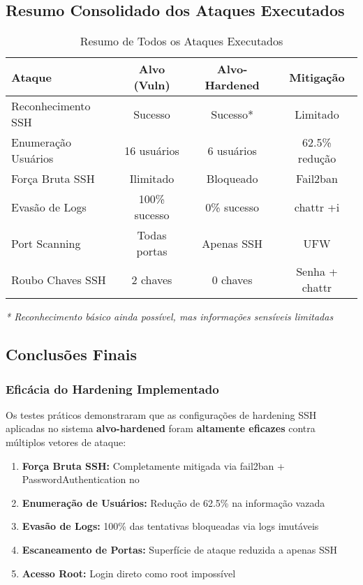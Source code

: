 \documentclass[12pt]{article}
\begin{document}
\subsection{Resumo Consolidado dos Ataques Executados}

\begin{table}[h]
\centering
\begin{tabular}{|l|c|c|c|}
\hline
\textbf{Ataque} & \textbf{Alvo (Vuln)} & \textbf{Alvo-Hardened} & \textbf{Mitigação} \\ \hline
Reconhecimento SSH & Sucesso & Sucesso* & Limitado \\ \hline
Enumeração Usuários & 16 usuários & 6 usuários & 62.5\% redução \\ \hline
Força Bruta SSH & Ilimitado & Bloqueado & Fail2ban \\ \hline
Evasão de Logs & 100\% sucesso & 0\% sucesso & chattr +i \\ \hline
Port Scanning & Todas portas & Apenas SSH & UFW \\ \hline
Roubo Chaves SSH & 2 chaves & 0 chaves & Senha + chattr \\ \hline
\end{tabular}
\caption{Resumo de Todos os Ataques Executados}
\end{table}

\textit{* Reconhecimento básico ainda possível, mas informações sensíveis limitadas}

\subsection{Conclusões Finais}

\subsubsection{Eficácia do Hardening Implementado}

Os testes práticos demonstraram que as configurações de hardening SSH aplicadas no sistema \textbf{alvo-hardened} foram \textbf{altamente eficazes} contra múltiplos vetores de ataque:

\begin{enumerate}
    \item \textbf{Força Bruta SSH:} Completamente mitigada via fail2ban + PasswordAuthentication no
    \item \textbf{Enumeração de Usuários:} Redução de 62.5\% na informação vazada
    \item \textbf{Evasão de Logs:} 100\% das tentativas bloqueadas via logs imutáveis
    \item \textbf{Escaneamento de Portas:} Superfície de ataque reduzida a apenas SSH
    \item \textbf{Acesso Root:} Login direto como root impossível
\end{enumerate}
\end{document}
